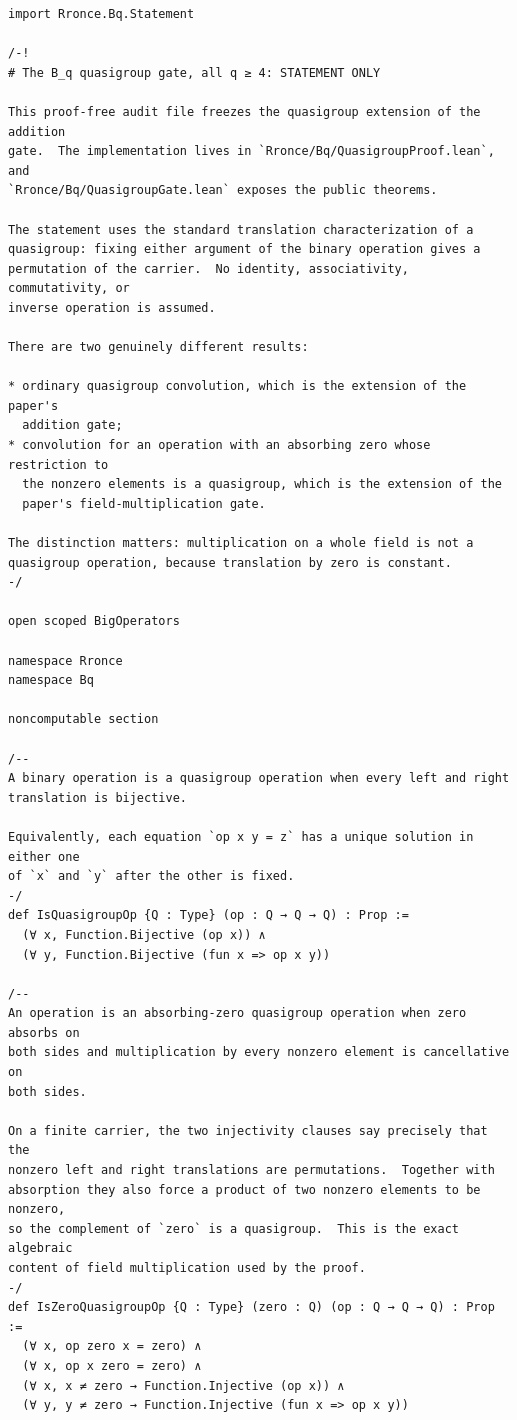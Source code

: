 \documentclass[11pt]{article}
\theoremstyle{definition}
\theoremstyle{remark}
\begin{document}
\begin{lstlisting}
import Rronce.Bq.Statement

/-!
# The B_q quasigroup gate, all q ≥ 4: STATEMENT ONLY

This proof-free audit file freezes the quasigroup extension of the addition
gate.  The implementation lives in `Rronce/Bq/QuasigroupProof.lean`, and
`Rronce/Bq/QuasigroupGate.lean` exposes the public theorems.

The statement uses the standard translation characterization of a
quasigroup: fixing either argument of the binary operation gives a
permutation of the carrier.  No identity, associativity, commutativity, or
inverse operation is assumed.

There are two genuinely different results:

* ordinary quasigroup convolution, which is the extension of the paper's
  addition gate;
* convolution for an operation with an absorbing zero whose restriction to
  the nonzero elements is a quasigroup, which is the extension of the
  paper's field-multiplication gate.

The distinction matters: multiplication on a whole field is not a
quasigroup operation, because translation by zero is constant.
-/

open scoped BigOperators

namespace Rronce
namespace Bq

noncomputable section

/--
A binary operation is a quasigroup operation when every left and right
translation is bijective.

Equivalently, each equation `op x y = z` has a unique solution in either one
of `x` and `y` after the other is fixed.
-/
def IsQuasigroupOp {Q : Type} (op : Q → Q → Q) : Prop :=
  (∀ x, Function.Bijective (op x)) ∧
  (∀ y, Function.Bijective (fun x => op x y))

/--
An operation is an absorbing-zero quasigroup operation when zero absorbs on
both sides and multiplication by every nonzero element is cancellative on
both sides.

On a finite carrier, the two injectivity clauses say precisely that the
nonzero left and right translations are permutations.  Together with
absorption they also force a product of two nonzero elements to be nonzero,
so the complement of `zero` is a quasigroup.  This is the exact algebraic
content of field multiplication used by the proof.
-/
def IsZeroQuasigroupOp {Q : Type} (zero : Q) (op : Q → Q → Q) : Prop :=
  (∀ x, op zero x = zero) ∧
  (∀ x, op x zero = zero) ∧
  (∀ x, x ≠ zero → Function.Injective (op x)) ∧
  (∀ y, y ≠ zero → Function.Injective (fun x => op x y))


\end{lstlisting}
\end{document}
